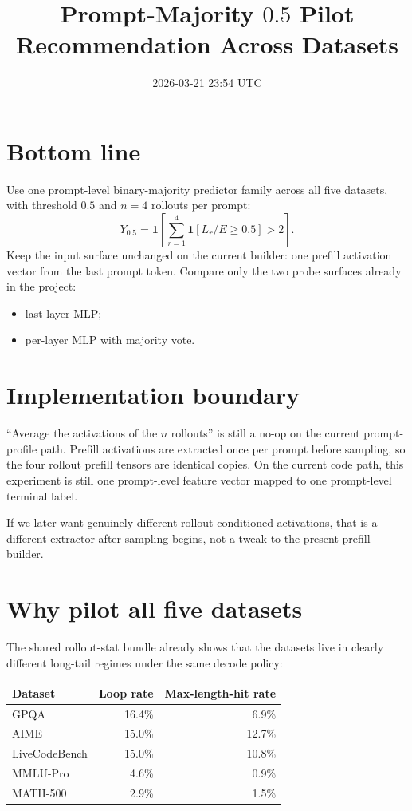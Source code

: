 \documentclass[11pt]{article}
\title{Prompt-Majority $0.5$ Pilot Recommendation Across Datasets}
\author{}
\date{2026-03-21 23:54 UTC}
\begin{document}
\maketitle

\section*{Bottom line}
Use one prompt-level binary-majority predictor family across all five datasets, with threshold $0.5$ and $n=4$ rollouts per prompt:
\[
Y_{0.5} = \mathbf{1}\!\left[\sum_{r=1}^{4} \mathbf{1}[L_r / E \ge 0.5] > 2 \right].
\]
Keep the input surface unchanged on the current builder: one prefill activation vector from the last prompt token. Compare only the two probe surfaces already in the project:
\begin{itemize}[leftmargin=1.5em]
\item last-layer MLP;
\item per-layer MLP with majority vote.
\end{itemize}

\section*{Implementation boundary}
``Average the activations of the $n$ rollouts'' is still a no-op on the current prompt-profile path. Prefill activations are extracted once per prompt before sampling, so the four rollout prefill tensors are identical copies. On the current code path, this experiment is still one prompt-level feature vector mapped to one prompt-level terminal label.

If we later want genuinely different rollout-conditioned activations, that is a different extractor after sampling begins, not a tweak to the present prefill builder.

\section*{Why pilot all five datasets}
The shared rollout-stat bundle already shows that the datasets live in clearly different long-tail regimes under the same decode policy:

\begin{center}
\begin{tabular}{lrr}
\toprule
Dataset & Loop rate & Max-length-hit rate \\
\midrule
GPQA & 16.4\% & 6.9\% \\
AIME & 15.0\% & 12.7\% \\
LiveCodeBench & 15.0\% & 10.8\% \\
MMLU-Pro & 4.6\% & 0.9\% \\
MATH-500 & 2.9\% & 1.5\% \\
\bottomrule
\end{tabular}
\end{center}
\end{document}

